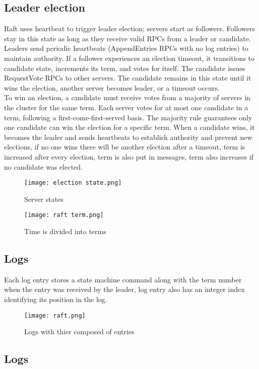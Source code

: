 \documentclass{article}
\begin{document}
\subsection{Leader election}
Raft uses heartbeat to trigger leader election; servers start as followers. Followers stay in this state as long as they receive valid RPCs from a leader or candidate. Leaders send periodic heartbeats (AppendEntries RPCs with no log entries) to maintain authority. If a follower experiences an election timeout, it transitions to candidate state, increments its term, and votes for itself. The candidate issues RequestVote RPCs to other servers. The candidate remains in this state until it wins the election, another server becomes leader, or a timeout occurs.\\
To win an election, a candidate must receive votes from a majority of servers in the cluster for the same term. Each server votes for at most one candidate in a term, following a first-come-first-served basis. The majority rule guarantees only one candidate can win the election for a specific term. When a candidate wins, it becomes the leader and sends heartbeats to establish authority and prevent new elections, if no one wins there will be another election after a timeout, term is increased after every election, term is also put in messages, term also increases if no candidate was elected.
\begin{figure}[t]
\texttt{[image: election state.png]}
\centering
\caption{Server states}
\end{figure}
\begin{figure}[t]
\texttt{[image: raft term.png]}
\centering
\caption{Time is divided into terms}
\end{figure}
\subsection{Logs}
Each log entry stores a state machine command along with the term
number when the entry was received by the leader, log entry also has an integer index identifying its position in the log.
\begin{figure}[t]
\texttt{[image: raft.png]}
\centering
\caption{Logs with thier composed of entries}
\end{figure}
\subsection{Logs}
\end{document}

